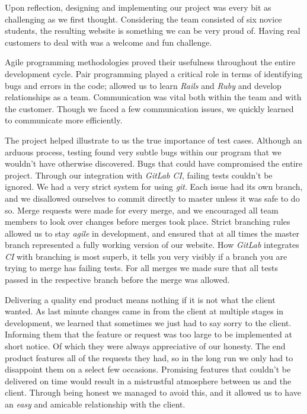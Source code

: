 \documentclass{l3proj}
\begin{document}
Upon reflection, designing and implementing our project was every bit as challenging as we first thought. Considering the team consisted of six novice students, the resulting website is something we can be very proud of. Having real customers to deal with was a welcome and fun challenge.

Agile programming methodologies proved their usefulness throughout the entire development cycle. Pair programming played a critical role in terms of identifying bugs and errors in the code; allowed us to learn \textit{Rails} and \textit{Ruby} and develop relationships as a team. Communication was vital both within the team and with the customer. Though we faced a few communication issues, we quickly learned to communicate more efficiently.

The project helped illustrate to us the true importance of test cases. Although an arduous process, testing found very subtle bugs within our program that we wouldn't have otherwise discovered. Bugs that could have compromised the entire project. Through our integration with \textit{GitLab CI}, failing tests couldn't be ignored. We had a very strict system for using \textit{git}. Each issue had its own branch, and we disallowed ourselves to commit directly to master unless it was safe to do so. Merge requests were made for every merge, and we encouraged all team members to look over changes before merges took place. Strict branching rules allowed us to stay \textit{agile} in development, and ensured that at all times the master branch represented a fully working version of our website. How \textit{GitLab} integrates \textit{CI} with branching is most superb, it tells you very visibly if a branch you are trying to merge has failing tests. For all merges we made sure that all tests passed in the respective branch before the merge was allowed.

Delivering a quality end product means nothing if it is not what the client wanted. As last minute changes came in from the client at multiple stages in development, we learned that sometimes we just had to say sorry to the client. Informing them that the feature or request was too large to be implemented at short notice. Of which they were always appreciative of our honesty. The end product features all of the requests they had, so in the long run we only had to disappoint them on a select few occasions. Promising features that couldn't be delivered on time would result in a mistrustful atmosphere between us and the client. Through being honest we managed to avoid this, and it allowed us to have an \textit{easy} and amicable relationship with the client.
\end{document}
